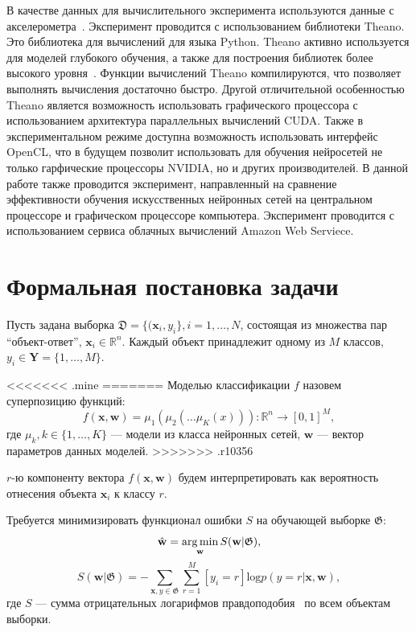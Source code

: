 \documentclass[12pt,twoside]{article}
\begin{document}
В качестве данных для вычислительного эксперимента используются данные с акселерометра~\cite{wisdm}. Эксперимент проводится с использованием библиотеки Theano. Это библиотека для вычислений для языка Python. Theano активно используется для моделей глубокого обучения, а также для построения библиотек более высокого уровня~\cite{lasagne, pylearn}. Функции вычислений Theano компилируются, что позволяет выполнять вычисления достаточно быстро. Другой отличительной особенностью Theano является возможность использовать графического процессора с использованием архитектура параллельных вычислений CUDA. Также в экспериментальном режиме доступна возможность использовать интерфейс OpenCL, что в будущем позволит использовать для обучения нейросетей не только гарфические процессоры NVIDIA, но и других производителей. В данной работе также проводится эксперимент, направленный на сравнение эффективности обучения искусственных нейронных сетей на центральном процессоре и графическом процессоре компьютера. Эксперимент проводится с использованием сервиса облачных вычислений Amazon Web Serviece.

\section{Формальная постановка задачи}
Пусть задана выборка $\mathfrak{D} = \{(\mathbf{x}_i,y_i\}, i = 1,\dots,N$, состоящая из множества пар ``объект-ответ'', $\mathbf{x}_i \in \mathbb{R}^n$. Каждый объект принадлежит одному из $M$ классов, $y_i \in \mathbf{Y} = \{1,\dots,M\}$.

<<<<<<< .mine
=======
Моделью классификации $f$ назовем суперпозицию функций:
\[
    f(\mathbf{x},\mathbf{w}) =  \mu_1(\mu_2(\dots \mu_K(x))): \mathbb{R}^n \to [0,1]^M,
\]
где $\mu_k, k \in \{1,\dots,K\}$ --- модели из класса нейронных сетей, $\mathbf{w}$ --- вектор параметров данных моделей. 
>>>>>>> .r10356

$r$-ю компоненту вектора $f(\mathbf{x},\mathbf{w})$ будем интерпретировать как вероятность отнесения объекта $\mathbf{x}_i$ к классу $r$.

Требуется минимизировать функционал ошибки $S$ на обучающей выборке $\mathfrak{G}$:
\[
    \hat{\mathbf{w}} = \argmin_\mathbf{w} S(\mathbf{w}|\mathfrak{G}),
\]
\[
    S(\mathbf{w}|\mathfrak{G}) = -\sum_{\mathbf{x},y \in \mathfrak{G} } \sum_{r=1}^M [y_i = r] \text{log} p(y=r|\mathbf{x},\mathbf{w}),
\]
где $S$ --- сумма отрицательных логарифмов правдоподобия~\cite{nnl} по всем объектам выборки.
\end{document}

